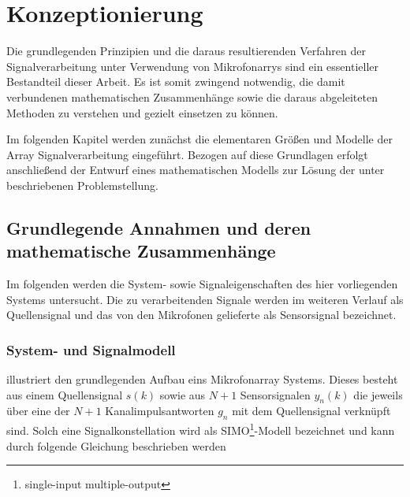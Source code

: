 \chapter{Konzeptionierung}
\label{chap:Konzeptionierung}
Die grundlegenden Prinzipien und die daraus resultierenden Verfahren der Signalverarbeitung unter Verwendung von Mikrofonarrys sind ein essentieller Bestandteil dieser Arbeit. Es ist somit zwingend notwendig, die damit verbundenen mathematischen Zusammenhänge sowie die daraus abgeleiteten Methoden zu verstehen und gezielt einsetzen zu können.

Im folgenden Kapitel werden zunächst die elementaren Größen und Modelle der Array Signalverarbeitung eingeführt. Bezogen auf diese Grundlagen erfolgt anschließend der Entwurf eines mathematischen Modells zur Lösung der unter  beschriebenen Problemstellung.

\section{Grundlegende Annahmen und deren mathematische Zusammenhänge}
\label{sec:AnnahmenUndMatheZusammenhaenge}
Im folgenden werden die System- sowie Signaleigenschaften des hier vorliegenden Systems untersucht. Die zu verarbeitenden Signale werden im weiteren Verlauf als Quellensignal und das von den Mikrofonen gelieferte als Sensorsignal bezeichnet.


\subsection{System- und Signalmodell}
\label{subsec:Systemmodell}

 illustriert den grundlegenden Aufbau eins Mikrofonarray Systems. Dieses besteht aus einem Quellensignal $s(k)$ sowie aus $N+1$ Sensorsignalen $y_n(k)$ die jeweils über eine der $N+1$ Kanalimpulsantworten $g_n$ mit dem Quellensignal verknüpft sind. Solch eine Signalkonstellation wird als SIMO\footnote{single-input multiple-output}-Modell \cite[S. 141]{Book_Array_Benesty} bezeichnet und kann durch folgende Gleichung beschrieben werden


